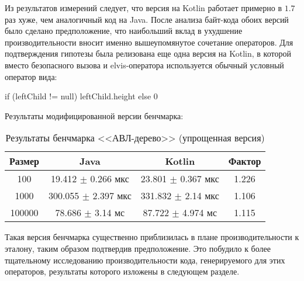 Из результатов измерений следует, что версия на Kotlin работает примерно в $1.7$ раз хуже, чем
аналогичный код на Java.
После анализа байт-кода обоих версий было сделано предположение, что наибольший вклад в ухудшение
производительности вносит именно вышеупомянутое сочетание операторов.
Для подтверждения гипотезы была релизована еще одна версия на Kotlin, в которой вместо
безопасного вызова и elvis-оператора используется обычный условный оператор вида:
\begin{pyglist}[language=kotlin]
if (leftChild != null) leftChild.height else 0
\end{pyglist}

Результаты модифицированной версии бенчмарка:

\begin{table}[h]
\begin{center}
\begin{tabular}{|c|c|c|c|} \hline
Размер & Java & Kotlin & Фактор \\ \hline
100 & 19.412 $\pm$ 0.266 мкс & 23.801 $\pm$ 0.367 мкс & 1.226\\ \hline
1000 & 300.055 $\pm$ 2.397 мкс & 331.832 $\pm$ 2.14 мкс & 1.106\\ \hline
100000 & 78.686 $\pm$ 3.14 мс & 87.722 $\pm$ 4.974 мс & 1.115\\ \hline
\end{tabular}
\caption{Результаты бенчмарка <<АВЛ-дерево>> (упрощенная версия)}
\end{center}
\end{table}

Такая версия бенчмарка существенно приблизилась в плане производительности к эталону, таким образом
подтвердив предположение.
Это побудило к более тщательному исследованию производительности кода, генерируемого
для этих операторов, результаты которого изложены в следующем разделе.

